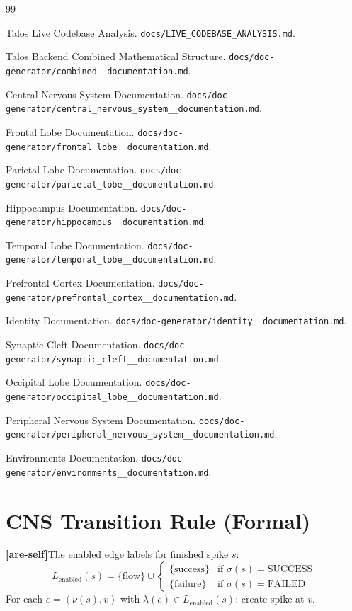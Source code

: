 \documentclass[11pt]{article}
\newcommand{\areself}{\textbf{[are-self]}}
\begin{document}
	\clearpage
	\begin{thebibliography}{99}
		
		Talos Live Codebase Analysis. \texttt{docs/LIVE\_CODEBASE\_ANALYSIS.md}.
		
		Talos Backend Combined Mathematical Structure. \texttt{docs/doc-generator/combined\_\_documentation.md}.
		
		Central Nervous System Documentation. \texttt{docs/doc-generator/central\_nervous\_system\_\_documentation.md}.
		
		Frontal Lobe Documentation. \texttt{docs/doc-generator/frontal\_lobe\_\_documentation.md}.
		
		Parietal Lobe Documentation. \texttt{docs/doc-generator/parietal\_lobe\_\_documentation.md}.
		
		Hippocampus Documentation. \texttt{docs/doc-generator/hippocampus\_\_documentation.md}.
		
		Temporal Lobe Documentation. \texttt{docs/doc-generator/temporal\_lobe\_\_documentation.md}.
		
		Prefrontal Cortex Documentation. \texttt{docs/doc-generator/prefrontal\_cortex\_\_documentation.md}.
		
		Identity Documentation. \texttt{docs/doc-generator/identity\_\_documentation.md}.
		
		Synaptic Cleft Documentation. \texttt{docs/doc-generator/synaptic\_cleft\_\_documentation.md}.
		
		Occipital Lobe Documentation. \texttt{docs/doc-generator/occipital\_lobe\_\_documentation.md}.
		
		Peripheral Nervous System Documentation. \texttt{docs/doc-generator/peripheral\_nervous\_system\_\_documentation.md}.
		
		Environments Documentation. \texttt{docs/doc-generator/environments\_\_documentation.md}.
		
	\end{thebibliography}
	
	\appendix
	
	\section{CNS Transition Rule (Formal)}
	\label{are-self:appendix-transition}
	\areself The enabled edge labels for finished spike $s$:
	$$
	L_{\text{enabled}}(s) = \{\text{flow}\} \cup \begin{cases}
	\{\text{success}\} & \text{if } \sigma(s) = \text{SUCCESS} \\
	\{\text{failure}\} & \text{if } \sigma(s) = \text{FAILED}
	\end{cases}
	$$
	For each $e = (\nu(s), v)$ with $\lambda(e) \in L_{\text{enabled}}(s)$: create spike at $v$.
	
\end{document}
